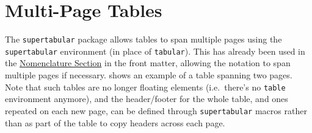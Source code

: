 
\section{Multi-Page Tables}\label{sec:multipagetables}

The \texttt{supertabular} package allows tables to span multiple pages using
the \texttt{supertabular} environment (in place of \texttt{tabular}). This has
already been used in the \hyperref[fr:notation]{Nomenclature Section} in the
front matter, allowing the notation to span multiple pages if necessary.
 shows an example of a table spanning two pages. Note
that such tables are no longer floating elements (i.e.~there's no
\texttt{table} environment anymore), and the header/footer for the whole
table, and ones repeated on each new page, can be defined through
\texttt{supertabular} macros rather than as part of the table to copy headers
across each page.

